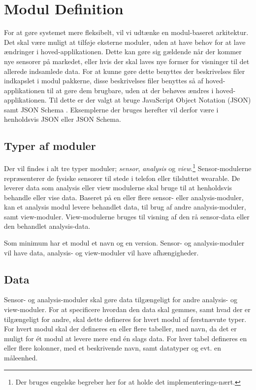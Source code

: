 \section{Modul Definition}


For at gøre systemet mere fleksibelt, vil vi udtænke en modul-baseret arkitektur.
Det skal være muligt at tilføje eksterne moduler, uden at have behov for at lave ændringer i hoved-applikationen.
Dette kan gøre sig gældende når der kommer nye sensorer på markedet, eller hvis der skal laves nye former for visninger til det allerede indsamlede data.
For at kunne gøre dette benyttes der beskrivelses filer indkapslet i modul pakkerne, disse beskrivelses filer benyttes så af hoved-applikationen til at gøre dem brugbare, uden at der behøves ændres i hoved-applikationen.
Til dette er der valgt at bruge JavaScript Object Notation (JSON) samt JSON Schema \cite{json_schema}.
Eksemplerne der bruges herefter vil derfor være i henholdsvis JSON eller JSON Schema.

\subsection{Typer af moduler}
Der vil findes i alt tre typer moduler; \textit{sensor}, \textit{analysis} og \textit{view}.\footnote{Der bruges engelske begreber her for at holde det implementerings-nært.}
Sensor-modulerne repræsenterer de fysiske sensorer til stede i telefon eller tilsluttet wearable.
De leverer data som analysis eller view modulerne skal bruge til at henholdsvis behandle eller vise data.
Baseret på en eller flere sensor- eller analysis-moduler, kan et analysis modul levere behandlet data, til brug af andre analysis-moduler, samt view-moduler.
View-modulerne bruges til visning af den rå sensor-data eller den behandlet analysis-data.

Som minimum har et modul et navn og en version.
Sensor- og analysis-moduler vil have data, analysis- og view-moduler vil have afhængigheder.

\subsection{Data}
Sensor- og analysis-moduler skal gøre data tilgængeligt for andre analysis- og view-moduler.
For at specificere hvordan den data skal gemmes, samt hvad der er tilgængeligt for andre, skal dette defineres for hvert modul af førstnævnte typer.
For hvert modul skal der defineres en eller flere tabeller, med navn, da det er muligt for ét modul at levere mere end én slags data.
For hver tabel defineres en eller flere kolonner, med et beskrivende navn, samt datatyper og evt. en måleenhed.

